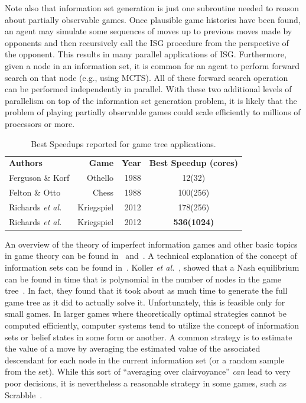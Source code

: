 \documentclass[times, 10pt,twocolumn]{article}
\newcommand{\etal}{{\em et al.}\ }
\begin{document}
Note also that information set generation is just one subroutine needed to
reason about partially observable games.  Once plausible game histories have
been found, an agent may simulate some sequences of moves up to previous moves
made by opponents and then recursively call the ISG procedure from the
perspective of the opponent.  This results in many parallel applications of
ISG. Furthermore, given a node in an information set, it is common for an agent
to perform forward search on that node (e.g., using MCTS).  All of these
forward search operation can be performed independently in parallel. With these
two additional levels of parallelism on top of the information set generation
problem, it is likely that the problem of playing partially observable
games could scale efficiently to millions of processors or more.

\begin{table}[tphb]
\centering
\begin{tabular}{lrrc}
{\bf Authors} & {\bf Game} & {\bf Year} & {\bf Best Speedup (cores)} \\
Ferguson \& Korf & Othello & 1988 & 12(32) \\
Felton \& Otto & Chess & 1988 & 100(256) \\
Richards \etal & Kriegspiel & 2012 & 178(256) \\
Richards \etal & Kriegspiel & 2012 & {\bf 536(1024)} \\
\end{tabular}
\caption{Best Speedups reported for game tree applications.}
\vspace{-0.2in}
\label{bestspeedups}
\end{table}

An overview of the theory of imperfect information games and other basic topics
in game theory can be found in~\cite{kuhn03lectures} and~\cite{kuhn97classics}.
A technical explanation of the concept of information sets can be found
in~\cite{gilpin07algorithms}.  Koller \etal, showed that a Nash equilibrium can
be found in time that is polynomial in the number of nodes in the game
tree~\cite{koller94fast}.  In fact, they found that it took about as much time
to generate the full game tree as it did to actually solve it.  Unfortunately,
this is feasible only for small games.  In larger games where theoretically
optimal strategies cannot be computed efficiently, computer systems tend to
utilize the concept of information sets or belief states in some form or
another.  A common strategy is to estimate the value of a move by averaging the
estimated value of the associated descendant for each node in the current
information set (or a random sample from the set).  While this sort of
``averaging over clairvoyance'' {\em can} lead to very poor decisions, it is
nevertheless a reasonable strategy in some games, such as
Scrabble~\cite{sheppard02world}.
\end{document}
